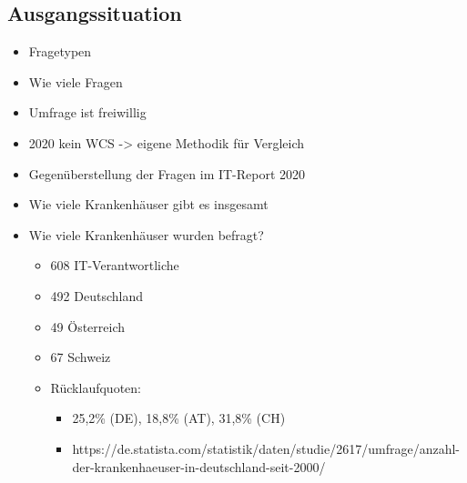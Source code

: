 \subsection{Ausgangssituation}
\begin{itemize}
	\item Fragetypen
	\item Wie viele Fragen
	\item Umfrage ist freiwillig
	\item 2020 kein WCS -> eigene Methodik für Vergleich
	\item Gegenüberstellung der Fragen im IT-Report 2020 \parencite{huebner2020}
	\item Wie viele Krankenhäuser gibt es insgesamt
	\item Wie viele Krankenhäuser wurden befragt? \parencite[31]{huebner2020}
	\begin{itemize}
		\item 608 IT-Verantwortliche
		\item 492 Deutschland
		\item 49 Österreich
		\item 67 Schweiz
		\item Rücklaufquoten:
		\begin{itemize}
			\item 25,2\% (DE), 18,8\% (AT), 31,8\% (CH)
			\item https://de.statista.com/statistik/daten/studie/2617/umfrage/anzahl-der-krankenhaeuser-in-deutschland-seit-2000/
		\end{itemize}
	\end{itemize}
\end{itemize}
